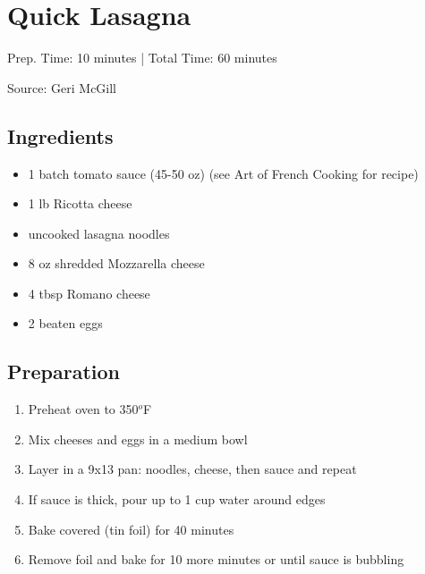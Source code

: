 \section{Quick Lasagna}

\begin{center}
Prep. Time: 10 minutes |
Total Time: 60 minutes

\vspace{1em}

Source: Geri McGill
\end{center}

\subsection{Ingredients}
\begin{itemize}
    \item 1 batch tomato sauce (45-50 oz) (see Art of French Cooking for recipe)
    \item 1 lb Ricotta cheese
    \item uncooked lasagna noodles
    \item 8 oz shredded Mozzarella cheese
    \item 4 tbsp Romano cheese
    \item 2 beaten eggs
\end{itemize}

\subsection{Preparation}
\begin{enumerate}
    \item Preheat oven to 350$^o$F
    \item Mix cheeses and eggs in a medium bowl
    \item Layer in a 9x13 pan: noodles, cheese, then sauce and repeat
    \item If sauce is thick, pour up to 1 cup water around edges
    \item Bake covered (tin foil) for 40 minutes
    \item Remove foil and bake for 10 more minutes or until sauce is bubbling
\end{enumerate}

